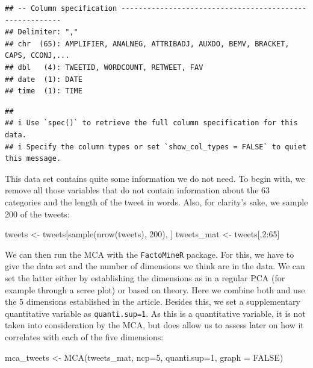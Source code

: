 \documentclass[
]{article}
\newenvironment{Shaded}{\begin{snugshade}}{\end{snugshade}}
\newcommand{\AttributeTok}[1]{\textcolor[rgb]{0.77,0.63,0.00}{#1}}
\newcommand{\ConstantTok}[1]{\textcolor[rgb]{0.00,0.00,0.00}{#1}}
\newcommand{\DecValTok}[1]{\textcolor[rgb]{0.00,0.00,0.81}{#1}}
\newcommand{\FunctionTok}[1]{\textcolor[rgb]{0.00,0.00,0.00}{#1}}
\newcommand{\NormalTok}[1]{#1}
\newcommand{\OtherTok}[1]{\textcolor[rgb]{0.56,0.35,0.01}{#1}}
\newcommand{\SpecialCharTok}[1]{\textcolor[rgb]{0.00,0.00,0.00}{#1}}
\begin{document}
\begin{verbatim}
## -- Column specification --------------------------------------------------------
## Delimiter: ","
## chr  (65): AMPLIFIER, ANALNEG, ATTRIBADJ, AUXDO, BEMV, BRACKET, CAPS, CCONJ,...
## dbl   (4): TWEETID, WORDCOUNT, RETWEET, FAV
## date  (1): DATE
## time  (1): TIME
\end{verbatim}

\begin{verbatim}
## 
## i Use `spec()` to retrieve the full column specification for this data.
## i Specify the column types or set `show_col_types = FALSE` to quiet this message.
\end{verbatim}

This data set contains quite some information we do not need. To begin with, we remove all those variables that do not contain information about the 63 categories and the length of the tweet in words. Also, for clarity's sake, we sample 200 of the tweets:

\begin{Shaded}
\begin{Highlighting}[]
\NormalTok{tweets }\OtherTok{\textless{}{-}}\NormalTok{ tweets[}\FunctionTok{sample}\NormalTok{(}\FunctionTok{nrow}\NormalTok{(tweets), }\DecValTok{200}\NormalTok{), ]}
\NormalTok{tweets\_mat }\OtherTok{\textless{}{-}}\NormalTok{ tweets[,}\DecValTok{2}\SpecialCharTok{:}\DecValTok{65}\NormalTok{]}
\end{Highlighting}
\end{Shaded}

We can then run the MCA with the \texttt{FactoMineR} package. For this, we have to give the data set and the number of dimensions we think are in the data. We can set the latter either by establishing the dimensions as in a regular PCA (for example through a scree plot) or based on theory. Here we combine both and use the 5 dimensions established in the article. Besides this, we set a supplementary quantitative variable as \texttt{quanti.sup=1}. As this is a quantitative variable, it is not taken into consideration by the MCA, but does allow us to assess later on how it correlates with each of the five dimensions:

\begin{Shaded}
\begin{Highlighting}[]
\NormalTok{mca\_tweets }\OtherTok{\textless{}{-}} \FunctionTok{MCA}\NormalTok{(tweets\_mat, }\AttributeTok{ncp=}\DecValTok{5}\NormalTok{, }\AttributeTok{quanti.sup=}\DecValTok{1}\NormalTok{, }\AttributeTok{graph =} \ConstantTok{FALSE}\NormalTok{)}
\end{Highlighting}
\end{Shaded}
\end{document}
